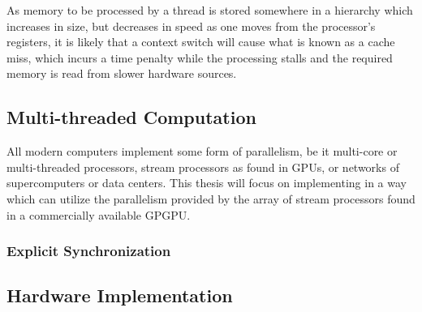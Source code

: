 {{As memory to be processed by a thread is stored somewhere in a hierarchy which increases in size, but decreases in speed as one moves from the processor's registers, it is likely that a context switch will cause what is known as a cache miss, which incurs a time penalty while the processing stalls and the required memory is read from slower hardware sources.


%
\subsection{Multi-threaded Computation}
All modern computers implement some form of parallelism, be it multi-core or multi-threaded processors, stream processors as found in GPUs, or networks of supercomputers or data centers. This thesis will focus on implementing  in a way which can utilize the parallelism provided by the array of stream processors found in a commercially available GPGPU.
\subsubsection{Explicit Synchronization}%
%
\subsection{Hardware Implementation}%
%
%
%

%
%
%

%


}}
